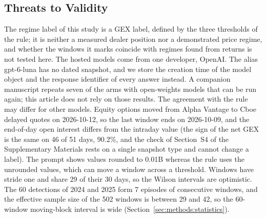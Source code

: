 \subsection{Threats to Validity}
\label{sec:discussion:threats}

The regime label of this study is a GEX label, defined by the three thresholds of the rule; it is neither a measured dealer position nor a demonstrated price regime, and whether the windows it marks coincide with regimes found from returns is not tested here. The hosted models come from one developer, OpenAI. The alias gpt-6-luna has no dated snapshot, and we store the creation time of the model object and the response identifier of every answer instead. A companion manuscript \cite{regan2026openweights} repeats seven of the arms with open-weights models that can be run again; this article does not rely on those results. The agreement with the rule may differ for other models.
Equity options moved from Alpha Vantage to Cboe delayed quotes on 2026-10-12, so the last window ends on 2026-10-09, and the end-of-day open interest differs from the intraday value (the sign of the net GEX is the same on 46 of 51 days, 90.2\%, and the check of Section~S4 of the Supplementary Materials rests on a single snapshot type and cannot change a label).
The prompt shows values rounded to 0.01B whereas the rule uses the unrounded values, which can move a window across a threshold.
Windows have stride one and share 29 of their 30 days, so the Wilson intervals are optimistic. The 60 detections of 2024 and 2025 form 7 episodes of consecutive windows, and the effective sample size of the 502 windows is between 29 and 42, so the 60-window moving-block interval is wide (Section~\ref{sec:methods:statistics}). %
